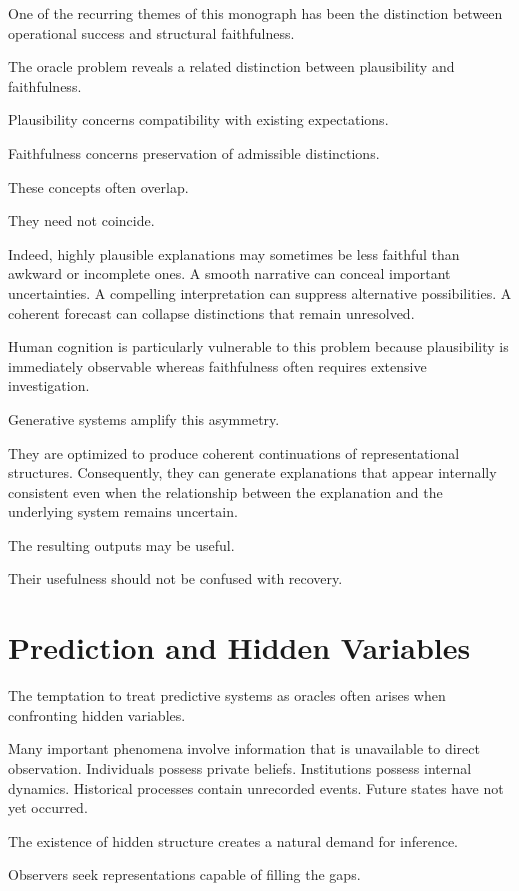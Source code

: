 \documentclass[11pt,oneside,openany]{book}
\begin{document}
One of the recurring themes of this monograph has been the distinction between operational success and structural faithfulness.

The oracle problem reveals a related distinction between plausibility and faithfulness.

Plausibility concerns compatibility with existing expectations.

Faithfulness concerns preservation of admissible distinctions.

These concepts often overlap.

They need not coincide.

Indeed, highly plausible explanations may sometimes be less faithful than awkward or incomplete ones. A smooth narrative can conceal important uncertainties. A compelling interpretation can suppress alternative possibilities. A coherent forecast can collapse distinctions that remain unresolved.

Human cognition is particularly vulnerable to this problem because plausibility is immediately observable whereas faithfulness often requires extensive investigation.

Generative systems amplify this asymmetry.

They are optimized to produce coherent continuations of representational structures. Consequently, they can generate explanations that appear internally consistent even when the relationship between the explanation and the underlying system remains uncertain.

The resulting outputs may be useful.

Their usefulness should not be confused with recovery.

\section{Prediction and Hidden Variables}

The temptation to treat predictive systems as oracles often arises when confronting hidden variables.

Many important phenomena involve information that is unavailable to direct observation. Individuals possess private beliefs. Institutions possess internal dynamics. Historical processes contain unrecorded events. Future states have not yet occurred.

The existence of hidden structure creates a natural demand for inference.

Observers seek representations capable of filling the gaps.
\end{document}
